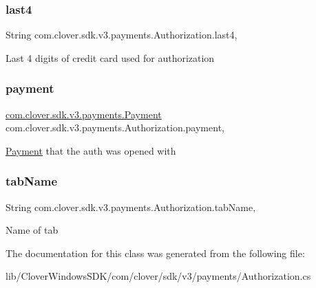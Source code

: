 \subsubsection{\texorpdfstring{last4}{last4}}
{\footnotesize\ttfamily String com.\+clover.\+sdk.\+v3.\+payments.\+Authorization.\+last4\hspace{0.3cm}{\ttfamily [get]}, {\ttfamily [set]}}



Last 4 digits of credit card used for authorization 

\mbox{\label{classcom_1_1clover_1_1sdk_1_1v3_1_1payments_1_1_authorization_a4a563a08317a13a4449fb5406cc8236e}} 
\subsubsection{\texorpdfstring{payment}{payment}}
{\footnotesize\ttfamily \hyperlink{classcom_1_1clover_1_1sdk_1_1v3_1_1payments_1_1_payment}{com.\+clover.\+sdk.\+v3.\+payments.\+Payment} com.\+clover.\+sdk.\+v3.\+payments.\+Authorization.\+payment\hspace{0.3cm}{\ttfamily [get]}, {\ttfamily [set]}}



\hyperlink{classcom_1_1clover_1_1sdk_1_1v3_1_1payments_1_1_payment}{Payment} that the auth was opened with 

\mbox{\label{classcom_1_1clover_1_1sdk_1_1v3_1_1payments_1_1_authorization_a0d0cd48415908380aa905a6a16c2dedc}} 
\subsubsection{\texorpdfstring{tab\+Name}{tabName}}
{\footnotesize\ttfamily String com.\+clover.\+sdk.\+v3.\+payments.\+Authorization.\+tab\+Name\hspace{0.3cm}{\ttfamily [get]}, {\ttfamily [set]}}



Name of tab 



The documentation for this class was generated from the following file\+:\begin{DoxyCompactItemize}
\item 
lib/\+Clover\+Windows\+S\+D\+K/com/clover/sdk/v3/payments/Authorization.\+cs\end{DoxyCompactItemize}
